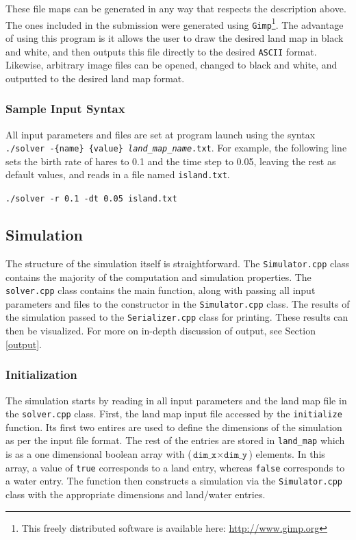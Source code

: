 \documentclass[a4paper,11pt]{article}
\begin{document}
{These file maps can be generated in any way that respects the description above.  The ones included in the submission were generated using \texttt{Gimp}\footnote{This freely distributed software is available here: \url{http://www.gimp.org}}.  The advantage of using this program is it allows the user to draw the desired land map in black and white, and then outputs this file directly to the desired \texttt{ASCII} format.  Likewise, arbitrary image files can be opened, changed to black and white, and outputted to the desired land map format.

  

\subsubsection{Sample Input Syntax}\label{syntax}

All input parameters and files are set at program launch using the syntax \texttt{./solver -\{name\} \{value\} \emph{land\_map\_name}.txt}.  For example, the following line sets the birth rate of hares to 0.1 and the time step to 0.05, leaving the rest as default values, and reads in a file named \texttt{island.txt}.

\vspace{5pt}
\noindent\texttt{./solver -r 0.1 -dt 0.05 island.txt}

\subsection{Simulation}

The structure of the simulation itself is straightforward.  The \texttt{Simulator.cpp} class contains the majority of the computation and simulation properties.  The \texttt{solver.cpp} class contains the main function, along with passing all input parameters and files to the constructor in the \texttt{Simulator.cpp} class.  The results of the simulation passed to the \texttt{Serializer.cpp} class for printing.  These results can then be visualized.  For more on in-depth discussion of output, see Section \ref{output}.

\subsubsection{Initialization}

The simulation starts by reading in all input parameters and the land map file in the \texttt{solver.cpp} class.  First, the land map input file accessed by the \texttt{initialize} function.  Its first two entires are used to define the dimensions of the simulation as per the input file format.  The rest of the entries are stored in \texttt{land\_map} which is as a one dimensional boolean array with ($\texttt{dim\_x} \times \texttt{dim\_y}$) elements.  In this array, a value of \texttt{true} corresponds to a land entry, whereas \texttt{false} corresponds to a water entry.  The function then constructs a simulation via the \texttt{Simulator.cpp} class with the appropriate dimensions and land/water entries.  

}
\end{document}
